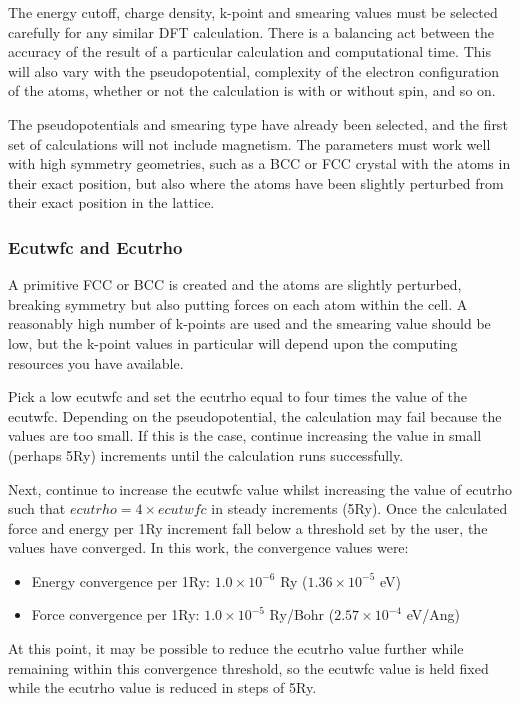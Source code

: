 The energy cutoff, charge density, k-point and smearing values must be selected carefully for any similar DFT calculation.  There is a balancing act between the accuracy of the result of a particular calculation and computational time.  This will also vary with the pseudopotential, complexity of the electron configuration of the atoms, whether or not the calculation is with or without spin, and so on.

The pseudopotentials and smearing type have already been selected, and the first set of calculations will not include magnetism.  The parameters must work well with high symmetry geometries, such as a BCC or FCC crystal with the atoms in their exact position, but also where the atoms have been slightly perturbed from their exact position in the lattice.

\subsubsection{Ecutwfc and Ecutrho}

A primitive FCC or BCC is created and the atoms are slightly perturbed, breaking symmetry but also putting forces on each atom within the cell.  A reasonably high number of k-points are used and the smearing value should be low, but the k-point values in particular will depend upon the computing resources you have available.

Pick a low ecutwfc and set the ecutrho equal to four times the value of the ecutwfc.  Depending on the pseudopotential, the calculation may fail because the values are too small.  If this is the case, continue increasing the value in small (perhaps 5Ry) increments until the calculation runs successfully.

Next, continue to increase the ecutwfc value whilst increasing the value of ecutrho such that $ecutrho = 4 \times ecutwfc$ in steady increments (5Ry).  Once the calculated force and energy per 1Ry increment fall below a threshold set by the user, the values have converged.  In this work, the convergence values were:

\begin{itemize}
\item Energy convergence per 1Ry: $1.0 \times 10^{-6}$ Ry ($1.36 \times 10^{-5}$ eV)
\item Force convergence per 1Ry: $1.0 \times 10^{-5}$ Ry/Bohr ($2.57 \times 10^{-4}$ eV/Ang)
\end{itemize}

At this point, it may be possible to reduce the ecutrho value further while remaining within this convergence threshold, so the ecutwfc value is held fixed while the ecutrho value is reduced in steps of 5Ry.

